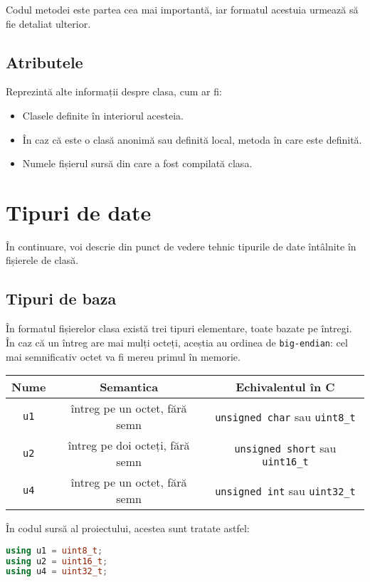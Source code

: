 Codul metodei este partea cea mai importantă, iar formatul acestuia
urmează să fie detaliat ulterior.

\subsection{Atributele}

Reprezintă alte informații despre clasa, cum ar fi:
\begin{itemize}
	\item Clasele definite în interiorul acesteia.
	\item În caz că este o clasă anonimă sau definită local, metoda în care este definită.
	\item Numele fișierul sursă din care a fost compilată clasa.
\end{itemize}

\section{Tipuri de date}

În continuare, voi descrie din punct de vedere tehnic tipurile de date
întâlnite în fișierele de clasă.

\subsection{Tipuri de baza}

În formatul fișierelor clasa există trei tipuri elementare, toate bazate pe
întregi. În caz că un întreg are mai mulți octeți, aceștia au ordinea de
\texttt{big-endian}: cel mai semnificativ octet va fi mereu primul în
memorie.

\begin{longtable}[]{@{}ccc@{}}
	\toprule
	Nume        & Semantica                       & Echivalentul în C\tabularnewline
	\midrule
	\endhead
	\texttt{u1} & întreg pe un octet, fără semn   & \texttt{unsigned\ char}
	sau \texttt{uint8\_t}\tabularnewline
	\texttt{u2} & întreg pe doi octeți, fără semn & \texttt{unsigned\ short}
	sau \texttt{uint16\_t}\tabularnewline
	\texttt{u4} & întreg pe un octet, fără semn   & \texttt{unsigned\ int} sau
	\texttt{uint32\_t}\tabularnewline
	\bottomrule
\end{longtable}

În codul sursă al proiectului, acestea sunt tratate astfel:

\begin{lstlisting}[language=C++]
using u1 = uint8_t;
using u2 = uint16_t;
using u4 = uint32_t;
\end{lstlisting}

